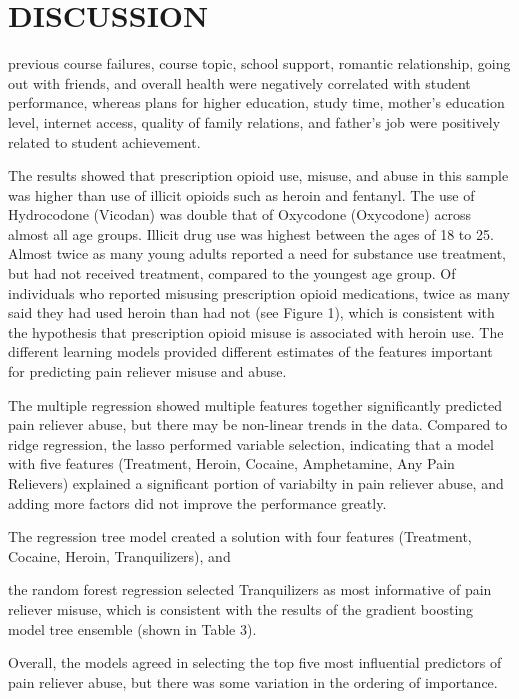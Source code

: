 \documentclass[sigconf]{acmart}
\begin{document}

\section{DISCUSSION}

previous course failures, course topic, school support, romantic relationship, 
going out with friends, and overall health were negatively correlated with 
student performance, whereas plans for higher education, study time, mother's
education level, internet access, quality of family relations, and father's 
job were positively related to student achievement.


The results showed that prescription opioid use, misuse, and abuse in this 
sample was higher than use of illicit opioids such as heroin and fentanyl. 
The use of Hydrocodone (Vicodan) was double that of Oxycodone (Oxycodone) 
across almost all age groups. Illicit drug use was highest between the ages 
of 18 to 25. Almost twice as many young adults reported a need for substance 
use treatment, but had not received treatment, compared to the youngest age 
group. Of individuals who reported misusing prescription opioid medications, 
twice as many said they had used heroin than had not (see Figure 1), which is 
consistent with the hypothesis that prescription opioid misuse is associated 
with heroin use. The different learning models provided different estimates 
of the features important for predicting pain reliever misuse and abuse. 


The multiple regression showed multiple features together significantly 
predicted pain reliever abuse, but there may be non-linear trends in the data.
Compared to ridge regression, the lasso performed variable selection, 
indicating that a model with five features (Treatment, Heroin, Cocaine, 
Amphetamine, Any Pain Relievers) explained a significant portion of
variabilty in pain reliever abuse, and adding more factors did not improve
the performance greatly. 

The regression tree model created a solution
with four features (Treatment, Cocaine, Heroin, Tranquilizers), and 

the
random forest regression selected Tranquilizers as most informative of
pain reliever misuse, which is consistent with the results of the gradient
boosting model tree ensemble (shown in Table 3). 

Overall, the models 
agreed in selecting the top five most influential predictors of pain
reliever abuse, but there was some variation in the ordering of importance. 
\end{document}
